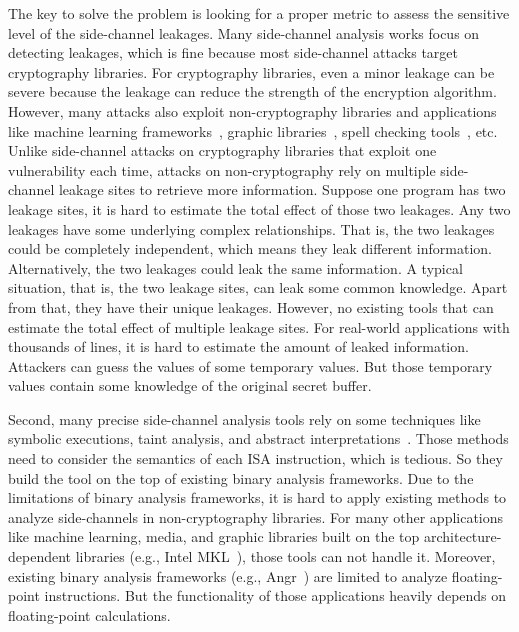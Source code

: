 The key to solve the problem is looking for a proper metric to assess the sensitive level of the side-channel leakages. Many side-channel analysis works focus on detecting leakages, which is fine because most side-channel attacks target cryptography libraries. For cryptography libraries, even a minor leakage can be severe because the leakage can reduce the strength of the encryption algorithm. However, many attacks also exploit non-cryptography libraries and applications like machine learning frameworks~\cite{yan2020cache,hong2018security}, graphic libraries~\cite{wang2019unveiling}, spell checking tools~\cite{xu2015controlled}, etc. Unlike side-channel attacks on cryptography libraries that exploit one vulnerability each time, attacks on non-cryptography rely on multiple side-channel leakage sites to retrieve more information. Suppose one program has two leakage sites, it is hard to estimate the total effect of those two leakages. Any two leakages have some underlying complex relationships. That is, the two leakages could be completely independent, which means they leak different information. Alternatively, the two leakages could leak the same information. A typical situation, that is, the two leakage sites, can leak some common knowledge. Apart from that, they have their unique leakages. However, no existing tools that can estimate the total effect of multiple leakage sites. For real-world applications with thousands of lines, it is hard to estimate the amount of leaked information. Attackers can guess the values of some temporary values. But those temporary values contain some knowledge of the original secret buffer. 

Second, many precise side-channel analysis tools rely on some techniques like symbolic executions, taint analysis, and abstract interpretations~\cite{wang2017cached,doychev2015cacheaudit,brotzman2019casym,wang2019identifying}. Those methods need to consider the semantics of each ISA instruction, which is tedious. So they build the tool on the top of existing binary analysis frameworks. Due to the limitations of binary analysis frameworks, it is hard to apply existing methods to analyze side-channels in non-cryptography libraries. For many other applications like machine learning, media, and graphic libraries built on the top architecture-dependent libraries (e.g., Intel MKL~\cite{wang2014intel}), those tools can not handle it. Moreover, existing binary analysis frameworks (e.g., Angr~\cite{shoshitaishvili2016state}) are limited to analyze floating-point instructions. But the functionality of those applications heavily depends on floating-point calculations.

